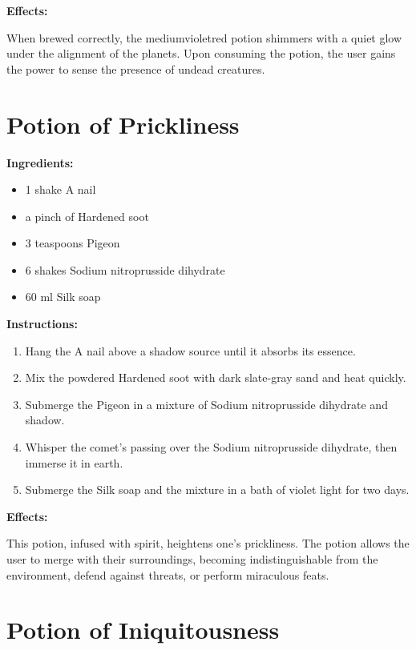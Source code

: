 \documentclass{article}
\begin{document}
\textbf{Effects:}

When brewed correctly, the mediumvioletred potion shimmers with a quiet glow under the alignment of the planets. Upon consuming the potion, the user gains the power to sense the presence of undead creatures.

\newpage
\section*{Potion of Prickliness}

\textbf{Ingredients:}

\begin{itemize}
  \item 1 shake A nail
  \item a pinch of Hardened soot
  \item 3 teaspoons Pigeon
  \item 6 shakes Sodium nitroprusside dihydrate
  \item 60 ml Silk soap
\end{itemize}

\textbf{Instructions:}

\begin{enumerate}
  \item Hang the A nail above a shadow source until it absorbs its essence.
  \item Mix the powdered Hardened soot with dark slate-gray sand and heat quickly.
  \item Submerge the Pigeon in a mixture of Sodium nitroprusside dihydrate and shadow.
  \item Whisper the comet’s passing over the Sodium nitroprusside dihydrate, then immerse it in earth.
  \item Submerge the Silk soap and the mixture in a bath of violet light for two days.
\end{enumerate}

\textbf{Effects:}

This potion, infused with spirit, heightens one's prickliness. The potion allows the user to merge with their surroundings, becoming indistinguishable from the environment, defend against threats, or perform miraculous feats.

\newpage
\section*{Potion of Iniquitousness}
\end{document}
